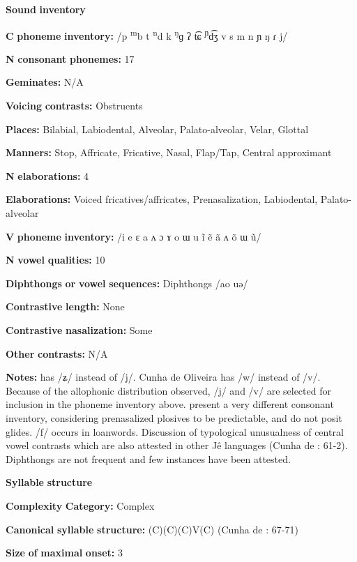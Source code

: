 \begin{styleBody}
\textbf{Sound} \textbf{inventory}

\textbf{C} \textbf{phoneme} \textbf{inventory:} /p \textsuperscript{m}b t \textsuperscript{n}d k \textsuperscript{ŋ}ɡ ʔ t͡ɕ \textsuperscript{ɲ}d͡ʒ v s m n ɲ ŋ ɾ j/

\textbf{N} \textbf{consonant} \textbf{phonemes:} 17

\textbf{Geminates:} N/A

\textbf{Voicing} \textbf{contrasts:} Obstruents

\textbf{Places:} Bilabial, Labiodental, Alveolar, Palato-alveolar, Velar, Glottal

\textbf{Manners:} Stop, Affricate, Fricative, Nasal, Flap/Tap, Central approximant

\textbf{N} \textbf{elaborations:} 4

\textbf{Elaborations:} Voiced fricatives/affricates, Prenasalization, Labiodental, Palato-alveolar

\textbf{V} \textbf{phoneme} \textbf{inventory:} /i e ɛ a ʌ ɔ ɤ o ɯ u ĩ ẽ ã ʌ õ ɯ ũ/

\textbf{N} \textbf{vowel} \textbf{qualities:} 10

\textbf{Diphthongs} \textbf{or} \textbf{vowel} \textbf{sequences:} Diphthongs /ao uə/

\textbf{Contrastive} \textbf{length:} None

\textbf{Contrastive} \textbf{nasalization:} Some

\textbf{Other} \textbf{contrasts:} N/A

\textbf{Notes:} \citet{Ham2009} has /ʑ/ instead of /j/. Cunha de Oliveira has /w/ instead of /v/. Because of the allophonic distribution observed, /j/ and /v/ are selected for inclusion in the phoneme inventory above. \citet{BurgessHam1968} present a very different consonant inventory, considering prenasalized plosives to be predictable, and do not posit glides. /f/ occurs in loanwords. Discussion of typological unusualness of central vowel contrasts which are also attested in other Jê languages (Cunha de \citealt{Oliveira2005}: 61-2). Diphthongs are not frequent and few instances have been attested.

\textbf{Syllable} \textbf{structure}

\textbf{Complexity} \textbf{Category:} Complex

\textbf{Canonical} \textbf{syllable} \textbf{structure:} (C)(C)(C)V(C) (Cunha de \citealt{Oliveira2005}: 67-71)

\textbf{Size} \textbf{of} \textbf{maximal} \textbf{onset:} 3


\end{styleBody}
